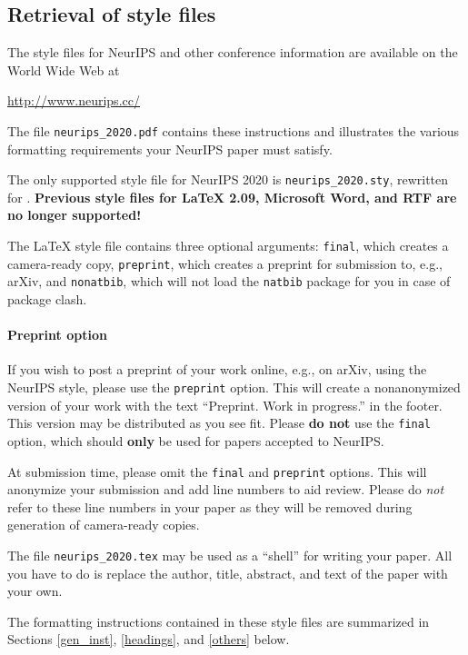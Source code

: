\documentclass{article}
\begin{document}
\subsection{Retrieval of style files}

The style files for NeurIPS and other conference information are available on
the World Wide Web at
\begin{center}
  \url{http://www.neurips.cc/}
\end{center}
The file \verb+neurips_2020.pdf+ contains these instructions and illustrates the
various formatting requirements your NeurIPS paper must satisfy.

The only supported style file for NeurIPS 2020 is \verb+neurips_2020.sty+,
rewritten for \LaTeXe{}.  \textbf{Previous style files for \LaTeX{} 2.09,
  Microsoft Word, and RTF are no longer supported!}

The \LaTeX{} style file contains three optional arguments: \verb+final+, which
creates a camera-ready copy, \verb+preprint+, which creates a preprint for
submission to, e.g., arXiv, and \verb+nonatbib+, which will not load the
\verb+natbib+ package for you in case of package clash.

\paragraph{Preprint option}
If you wish to post a preprint of your work online, e.g., on arXiv, using the
NeurIPS style, please use the \verb+preprint+ option. This will create a
nonanonymized version of your work with the text ``Preprint. Work in progress.''
in the footer. This version may be distributed as you see fit. Please \textbf{do
  not} use the \verb+final+ option, which should \textbf{only} be used for
papers accepted to NeurIPS.

At submission time, please omit the \verb+final+ and \verb+preprint+
options. This will anonymize your submission and add line numbers to aid
review. Please do \emph{not} refer to these line numbers in your paper as they
will be removed during generation of camera-ready copies.

The file \verb+neurips_2020.tex+ may be used as a ``shell'' for writing your
paper. All you have to do is replace the author, title, abstract, and text of
the paper with your own.

The formatting instructions contained in these style files are summarized in
Sections \ref{gen_inst}, \ref{headings}, and \ref{others} below.
\end{document}
